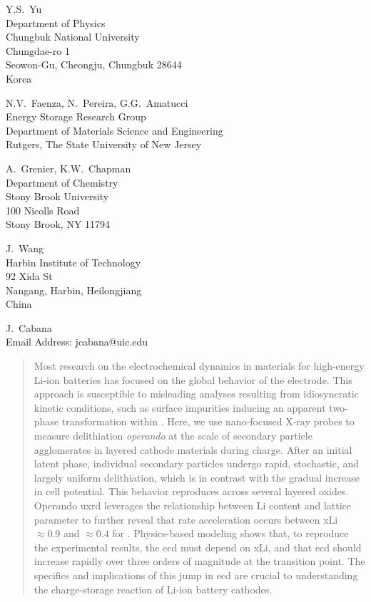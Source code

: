 \documentclass{WileyMSP-template}
\begin{document}
\begin{affiliations}
  Y.S.\ Yu \\
  Department of Physics \\
  Chungbuk National University \\
  Chungdae-ro 1 \\
  Seowon-Gu, Cheongju, Chungbuk 28644 \\
  Korea

  N.V.\ Faenza, N.\ Pereira, G.G.\ Amatucci \\
  Energy Storage Research Group \\
  Department of Materials Science and Engineering \\
  Rutgers, The State University of New Jersey

  A.\ Grenier, K.W.\ Chapman \\
  Department of Chemistry \\
  Stony Brook University \\
  100 Nicolls Road \\
  Stony Brook, NY 11794

  J.\ Wang \\
  Harbin Institute of Technology \\
  92 Xida St \\
  Nangang, Harbin, Heilongjiang \\
  China

  J.\ Cabana \\
  Email Address: jcabana@uic.edu
  
\end{affiliations}

\begin{abstract}
  Most research on the electrochemical dynamics in materials for
  high-energy Li-ion batteries has focused on the global behavior of
  the electrode. This approach is susceptible to misleading analyses
  resulting from idiosyncratic kinetic conditions, such as surface
  impurities inducing an apparent two-phase transformation within
  \nca{}. Here, we use nano-focused X-ray probes to measure
  delithiation \textit{operando} at the scale of secondary particle
  agglomerates in layered cathode materials during charge. After an
  initial latent phase, individual secondary particles undergo rapid,
  stochastic, and largely uniform delithiation, which is in contrast
  with the gradual increase in cell potential. This behavior
  reproduces across several layered oxides. Operando \gls{uxrd}
  leverages the relationship between Li content and lattice parameter
  to further reveal that rate acceleration occurs between \gls{xLi}
  $\approx 0.9$ and $\approx 0.4$ for \nca{}. Physics-based modeling
  shows that, to reproduce the experimental results, the \gls{ecd}
  must depend on \gls{xLi}, and that \gls{ecd} should increase rapidly
  over three orders of magnitude at the transition point. The
  specifics and implications of this jump in \gls{ecd} are crucial to
  understanding the charge-storage reaction of Li-ion battery
  cathodes.
\end{abstract}
\end{document}
